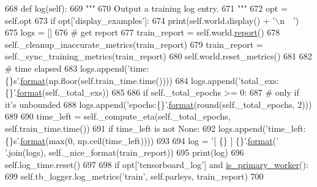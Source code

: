 \begin{DoxyCode}
668     \textcolor{keyword}{def }log(self):
669         \textcolor{stringliteral}{"""}
670 \textcolor{stringliteral}{        Output a training log entry.}
671 \textcolor{stringliteral}{        """}
672         opt = self.opt
673         \textcolor{keywordflow}{if} opt[\textcolor{stringliteral}{'display\_examples'}]:
674             print(self.world.display() + \textcolor{stringliteral}{'\(\backslash\)n~~'})
675         logs = []
676         \textcolor{comment}{# get report}
677         train\_report = self.world.\hyperlink{namespaceprojects_1_1convai2_1_1eval__f1_a01a47b9c08dad189837a51f085defc45}{report}()
678         self.\_cleanup\_inaccurate\_metrics(train\_report)
679         train\_report = self.\_sync\_training\_metrics(train\_report)
680         self.world.reset\_metrics()
681 
682         \textcolor{comment}{# time elapsed}
683         logs.append(\textcolor{stringliteral}{'time:\{\}s'}.\hyperlink{namespaceparlai_1_1chat__service_1_1services_1_1messenger_1_1shared__utils_a32e2e2022b824fbaf80c747160b52a76}{format}(np.floor(self.train\_time.time())))
684         logs.append(\textcolor{stringliteral}{'total\_exs:\{\}'}.\hyperlink{namespaceparlai_1_1chat__service_1_1services_1_1messenger_1_1shared__utils_a32e2e2022b824fbaf80c747160b52a76}{format}(self.\_total\_exs))
685 
686         \textcolor{keywordflow}{if} self.\_total\_epochs >= 0:
687             \textcolor{comment}{# only if it's unbounded}
688             logs.append(\textcolor{stringliteral}{'epochs:\{\}'}.\hyperlink{namespaceparlai_1_1chat__service_1_1services_1_1messenger_1_1shared__utils_a32e2e2022b824fbaf80c747160b52a76}{format}(round(self.\_total\_epochs, 2)))
689 
690         time\_left = self.\_compute\_eta(self.\_total\_epochs, self.train\_time.time())
691         \textcolor{keywordflow}{if} time\_left \textcolor{keywordflow}{is} \textcolor{keywordflow}{not} \textcolor{keywordtype}{None}:
692             logs.append(\textcolor{stringliteral}{'time\_left:\{\}s'}.\hyperlink{namespaceparlai_1_1chat__service_1_1services_1_1messenger_1_1shared__utils_a32e2e2022b824fbaf80c747160b52a76}{format}(max(0, np.ceil(time\_left))))
693 
694         log = \textcolor{stringliteral}{'[ \{\} ] \{\}'}.\hyperlink{namespaceparlai_1_1chat__service_1_1services_1_1messenger_1_1shared__utils_a32e2e2022b824fbaf80c747160b52a76}{format}(\textcolor{stringliteral}{' '}.join(logs), self.\_nice\_format(train\_report))
695         print(log)
696         self.log\_time.reset()
697 
698         \textcolor{keywordflow}{if} opt[\textcolor{stringliteral}{'tensorboard\_log'}] \textcolor{keywordflow}{and} \hyperlink{namespaceparlai_1_1utils_1_1distributed_a9bb1dac198180590ef8c6b6c6f9fc2c4}{is\_primary\_worker}():
699             self.tb\_logger.log\_metrics(\textcolor{stringliteral}{'train'}, self.parleys, train\_report)
700 
\end{DoxyCode}
